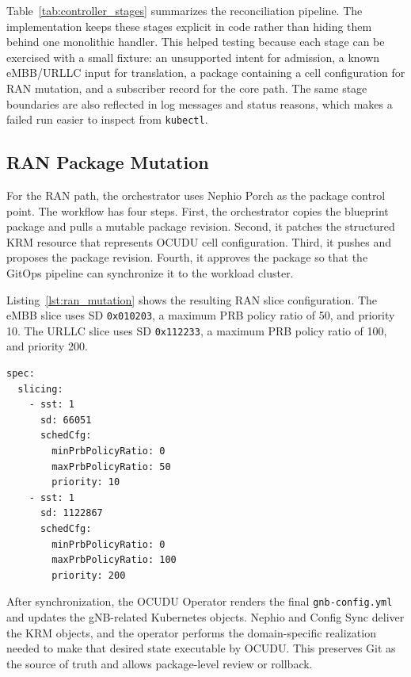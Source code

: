 Table~\ref{tab:controller_stages} summarizes the reconciliation pipeline. The implementation keeps these stages explicit in code rather than hiding them behind one monolithic handler. This helped testing because each stage can be exercised with a small fixture: an unsupported intent for admission, a known eMBB/URLLC input for translation, a package containing a cell configuration for RAN mutation, and a subscriber record for the core path. The same stage boundaries are also reflected in log messages and status reasons, which makes a failed run easier to inspect from \texttt{kubectl}.

\subsection{RAN Package Mutation}

For the RAN path, the orchestrator uses Nephio Porch as the package control point. The workflow has four steps. First, the orchestrator copies the blueprint package and pulls a mutable package revision. Second, it patches the structured KRM resource that represents OCUDU cell configuration. Third, it pushes and proposes the package revision. Fourth, it approves the package so that the GitOps pipeline can synchronize it to the workload cluster.

Listing~\ref{lst:ran_mutation} shows the resulting RAN slice configuration. The eMBB slice uses SD \texttt{0x010203}, a maximum PRB policy ratio of 50, and priority 10. The URLLC slice uses SD \texttt{0x112233}, a maximum PRB policy ratio of 100, and priority 200.

\begin{lstlisting}[caption={Mutated OCUDU slice configuration generated from intent translation}, label={lst:ran_mutation}]
spec:
  slicing:
    - sst: 1
      sd: 66051
      schedCfg:
        minPrbPolicyRatio: 0
        maxPrbPolicyRatio: 50
        priority: 10
    - sst: 1
      sd: 1122867
      schedCfg:
        minPrbPolicyRatio: 0
        maxPrbPolicyRatio: 100
        priority: 200
\end{lstlisting}

After synchronization, the OCUDU Operator renders the final \texttt{gnb-config.yml} and updates the gNB-related Kubernetes objects. Nephio and Config Sync deliver the KRM objects, and the operator performs the domain-specific realization needed to make that desired state executable by OCUDU. This preserves Git as the source of truth and allows package-level review or rollback.

